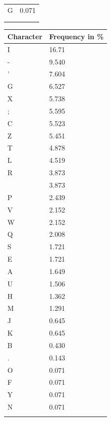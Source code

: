 \documentclass{uva-inf-presentation}
\begin{document}
\begin{frame}[containsverbatim]
\begin{minipage}{0.2\linewidth}
{\begin{tabular}{ll}
G & 0.071 \\
  &       \\ 
  &       \\ \bottomrule
\end{tabular}}
\end{minipage}%
\begin{minipage}{0.2\linewidth}
\centering
{\fontsize{3.5pt}{4.5pt}\selectfont
\begin{tabular}{ll}\toprule
Character & Frequency in \%     \\
\midrule
I & 16.71 \\
- & 9.540 \\
' & 7.604 \\
G & 6.527 \\
X & 5.738 \\
; & 5.595 \\
C & 5.523 \\
Z & 5.451 \\
T & 4.878 \\
L & 4.519 \\
R & 3.873 \\
  & 3.873 \\
P & 2.439 \\
V & 2.152 \\
W & 2.152 \\
Q & 2.008 \\
S & 1.721 \\
E & 1.721 \\
A & 1.649 \\
U & 1.506 \\
H & 1.362 \\
M & 1.291 \\
J & 0.645 \\
K & 0.645 \\
B & 0.430 \\
. & 0.143 \\
O & 0.071 \\
F & 0.071 \\
Y & 0.071 \\
N & 0.071 \\
  &       \\ \bottomrule
\end{tabular}}
\end{minipage}%
\end{frame}
\end{document}
